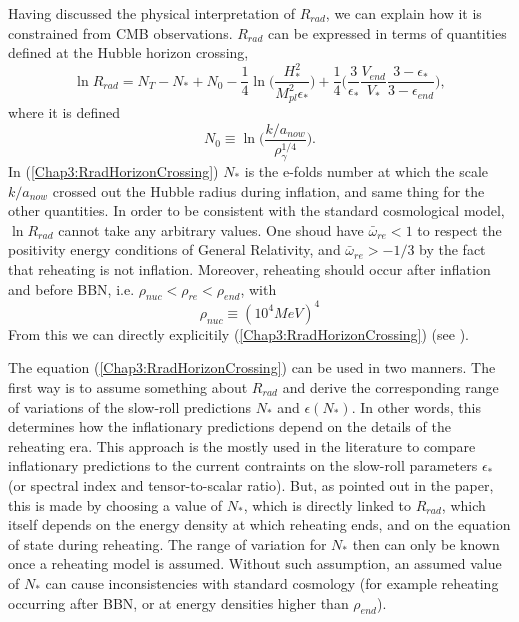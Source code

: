 \documentclass[11pt,a4paper,twoside]{book}
\begin{document}
 Having discussed the physical interpretation of $ R_{rad} $, we can explain how it is constrained from CMB observations. $ R_{rad} $ can be expressed in terms of quantities defined at the Hubble horizon crossing,
 \begin{equation}
 	\label{Chap3:RradHorizonCrossing}
 	\ln R_{rad} = N_{T} - N_{*} + N_{0} - \frac{1}{4}\ln \Bigg(\frac{H_{*}^{2}}{M_{pl}^{2}\epsilon_{*}}\Bigg) +\frac{1}{4}\Bigg(\frac{3}{\epsilon_{*}}\frac{V_{end}}{V_{*}}\frac{3-\epsilon_{*}}{3-\epsilon_{end}}\Bigg),
 \end{equation}
 where it is defined
 \begin{equation}
\label{Chap3:reheatingN0}
N_{0} \equiv \ln \Bigg(\frac{k/a_{now}}{\rho_{\gamma}^{1/4}}\Bigg).
 \end{equation}
 In (\ref{Chap3:RradHorizonCrossing})  $ N_{*} $ is the e-folds number at which the scale $ k/a_{now} $ crossed out the Hubble radius during inflation, and same thing for the other quantities. In order to be consistent with the standard cosmological model, $ \ln R_{rad} $ cannot take any arbitrary values. One shoud have $\bar{\omega}_{re}<1$ to respect the positivity energy conditions of General Relativity, and $ \bar{\omega}_{re} > -1/3 $ by the fact that reheating is not inflation. Moreover, reheating should occur after inflation and before BBN, i.e. $\rho_{nuc} < \rho_{re} < \rho_{end}$, with
 \begin{equation}
 	\label{Chap3:rhoNuc}
 	\rho_{nuc}\equiv(10^{4}MeV)^{4}
 \end{equation} 
From this we can directly explicitily (\ref{Chap3:RradHorizonCrossing}) (see \cite{Chap3:Martin_Ringeval}).

The equation (\ref{Chap3:RradHorizonCrossing}) can be used in two manners. The first way is to assume something about $ R_{rad} $ and derive the corresponding range of variations of the slow-roll predictions $ N_{*} $ and $\epsilon(N_{*})$. In other words, this determines how the inflationary predictions depend on the details of the reheating era. This approach is the mostly used in the literature to compare inflationary predictions to the current contraints on the slow-roll parameters $\epsilon_{*}$ (or spectral index and tensor-to-scalar ratio). But, as pointed out in the paper, this is made by choosing a value of $ N_{*} $, which is directly linked to $ R_{rad} $, which itself depends on the energy density at which reheating ends, and on the equation of state during reheating. The range of variation for $ N_{*} $ then can only be known once a reheating model is assumed. Without such assumption, an assumed value of $ N_{*} $ can cause inconsistencies with standard cosmology (for example reheating occurring after BBN, or at energy densities higher than $\rho_{end}$).
\end{document}

